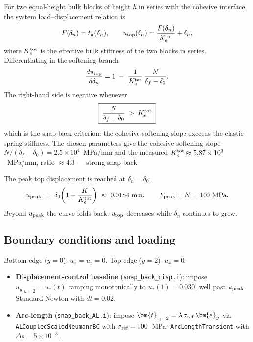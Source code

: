 For two equal-height bulk blocks of height $h$ in series with the cohesive
interface, the system load--displacement relation is
\begin{equation}
F(\delta_n) = t_n(\delta_n), \qquad
u_{\rm top}(\delta_n) = \frac{F(\delta_n)}{K_e^{\rm tot}} + \delta_n,
\end{equation}
where $K_e^{\rm tot}$ is the effective bulk stiffness of the two blocks in
series. Differentiating in the softening branch
\begin{equation}
\frac{d u_{\rm top}}{d \delta_n} =
1 \;-\; \frac{1}{K_e^{\rm tot}}\,\frac{N}{\delta_f - \delta_0}.
\end{equation}
The right-hand side is negative whenever
\begin{equation}
\boxed{\;\frac{N}{\delta_f - \delta_0} \;>\; K_e^{\rm tot}\;}
\label{eq:snap_back_condition}
\end{equation}
which is the snap-back criterion: the cohesive softening slope exceeds the
elastic spring stiffness. The chosen parameters give the cohesive softening
slope $N/(\delta_f - \delta_0) = 2.5\times 10^{4}$~MPa/mm and the measured
$K_e^{\rm tot} \approx 5.87\times 10^{3}$~MPa/mm, ratio $\approx 4.3$ —
strong snap-back.

The peak top displacement is reached at $\delta_n = \delta_0$:
\begin{equation}
u_{\rm peak} \;=\; \delta_0\!\left(1 + \frac{K}{K_e^{\rm tot}}\right)
\;\approx\; 0.0184~\text{mm}, \qquad F_{\rm peak} = N = 100~\text{MPa}.
\end{equation}
Beyond $u_{\rm peak}$ the curve folds back: $u_{\rm top}$ decreases while
$\delta_n$ continues to grow.

\subsection{Boundary conditions and loading}

Bottom edge ($y = 0$): $u_x = u_y = 0$.
Top edge ($y = 2$): $u_x = 0$.

\begin{itemize}
\item \textbf{Displacement-control baseline}
      (\texttt{snap\_back\_disp.i}): impose $u_y\big|_{y=2} = u_*(t)$ ramping
      monotonically to $u_*(1) = 0.030$, well past $u_{\rm peak}$. Standard
      Newton with $dt = 0.02$.
\item \textbf{Arc-length}
      (\texttt{snap\_back\_AL.i}): impose
      $\bm{t}\big|_{y=2} = \lambda\,\sigma_{\rm ref}\,\bm{e}_y$ via
      \texttt{ALCoupledScaledNeumannBC} with $\sigma_{\rm ref} = 100$~MPa.
      \texttt{ArcLengthTransient} with $\Delta s = 5\times 10^{-3}$.
\end{itemize}

